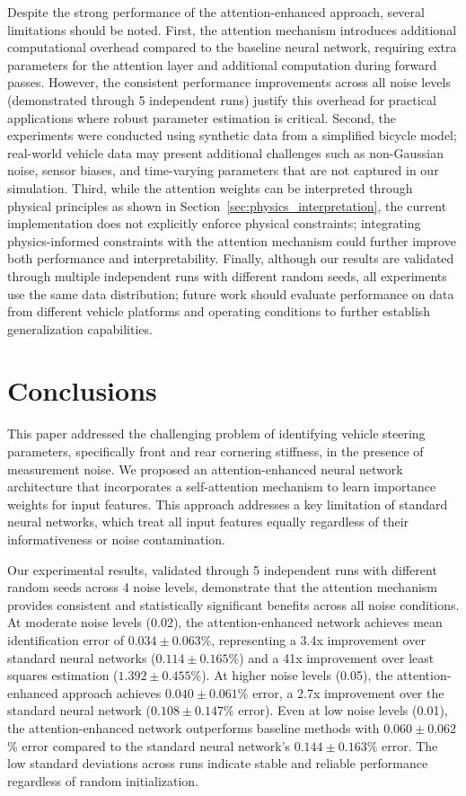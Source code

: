 \documentclass[Afour,sageh,times]{sagej}
\begin{document}
Despite the strong performance of the attention-enhanced approach, several limitations should be noted. First, the attention mechanism introduces additional computational overhead compared to the baseline neural network, requiring extra parameters for the attention layer and additional computation during forward passes. However, the consistent performance improvements across all noise levels (demonstrated through 5 independent runs) justify this overhead for practical applications where robust parameter estimation is critical. Second, the experiments were conducted using synthetic data from a simplified bicycle model; real-world vehicle data may present additional challenges such as non-Gaussian noise, sensor biases, and time-varying parameters that are not captured in our simulation. Third, while the attention weights can be interpreted through physical principles as shown in Section~\ref{sec:physics_interpretation}, the current implementation does not explicitly enforce physical constraints; integrating physics-informed constraints with the attention mechanism could further improve both performance and interpretability. Finally, although our results are validated through multiple independent runs with different random seeds, all experiments use the same data distribution; future work should evaluate performance on data from different vehicle platforms and operating conditions to further establish generalization capabilities.

\section{Conclusions}
\label{sec:conclusion}

This paper addressed the challenging problem of identifying vehicle steering parameters, specifically front and rear cornering stiffness, in the presence of measurement noise. We proposed an attention-enhanced neural network architecture that incorporates a self-attention mechanism to learn importance weights for input features. This approach addresses a key limitation of standard neural networks, which treat all input features equally regardless of their informativeness or noise contamination.

Our experimental results, validated through 5 independent runs with different random seeds across 4 noise levels, demonstrate that the attention mechanism provides consistent and statistically significant benefits across all noise conditions. At moderate noise levels (0.02), the attention-enhanced network achieves mean identification error of $0.034 \pm 0.063$\%, representing a 3.4x improvement over standard neural networks ($0.114 \pm 0.165$\%) and a 41x improvement over least squares estimation ($1.392 \pm 0.455$\%). At higher noise levels (0.05), the attention-enhanced approach achieves $0.040 \pm 0.061$\% error, a 2.7x improvement over the standard neural network ($0.108 \pm 0.147$\% error). Even at low noise levels (0.01), the attention-enhanced network outperforms baseline methods with $0.060 \pm 0.062$\% error compared to the standard neural network's $0.144 \pm 0.163$\% error. The low standard deviations across runs indicate stable and reliable performance regardless of random initialization.
\end{document}
